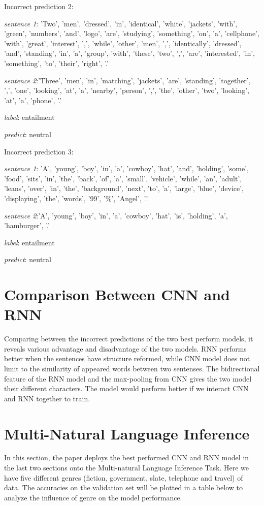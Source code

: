 \documentclass[10pt]{article}
\begin{document}
Incorrect prediction 2:\par
\textit{sentence 1}: 'Two', 'men', 'dressed', 'in', 'identical', 'white', 'jackets', 'with', 'green', 'numbers', 'and', 'logo', 'are', 'studying', 'something', 'on', 'a', 'cellphone', 'with', 'great', 'interest', ',', 'while', 'other', 'men', ',', 'identically', 'dressed', 'and', 'standing', 'in', 'a', 'group', 'with', 'these', 'two', ',', 'are', 'interested', 'in', 'something', 'to', 'their', 'right', '.'\par
\textit{sentence 2}:'Three', 'men', 'in', 'matching', 'jackets', 'are', 'standing', 'together', ',', 'one', 'looking', 'at', 'a', 'nearby', 'person', ',', 'the', 'other', 'two', 'looking', 'at', 'a', 'phone', '.'\par
\textit{label}: entailment\par
\textit{predict}: neutral\par


Incorrect prediction 3:\par
\textit{sentence 1}: 'A', 'young', 'boy', 'in', 'a', 'cowboy', 'hat', 'and', 'holding', 'some', 'food', 'sits', 'in', 'the', 'back', 'of', 'a', 'small', 'vehicle', 'while', 'an', 'adult', 'leans', 'over', 'in', 'the', 'background', 'next', 'to', 'a', 'large', 'blue', 'device', 'displaying', 'the', 'words', '99', '\%', 'Angel', '.'\par
\textit{sentence 2}:'A', 'young', 'boy', 'in', 'a', 'cowboy', 'hat', 'is', 'holding', 'a', 'hamburger', '.'\par
\textit{label}: entailment\par
\textit{predict}: neutral\par


\section{Comparison Between CNN and RNN}
Comparing between the incorrect predictions of the two best perform models, it reveals various advantage and disadvantage of the two models. RNN performs better when the sentences have structure reformed, while CNN model does not limit to the similarity of appeared words between two sentenses. The bidirectional feature of the RNN model and the max-pooling from CNN gives the two model their different characters.
The model would perform better if we interact CNN and RNN together to train.

\section{Multi-Natural Language Inference}
In this section, the paper deploys the best performed CNN and RNN model in the last two sections onto the Multi-natural Language Inference Task. Here we have five different genres (fiction, government, slate, telephone and travel) of data. The accuracies on the validation set will be plotted in a table below to analyze the influence of genre on the model performance.
\end{document}
